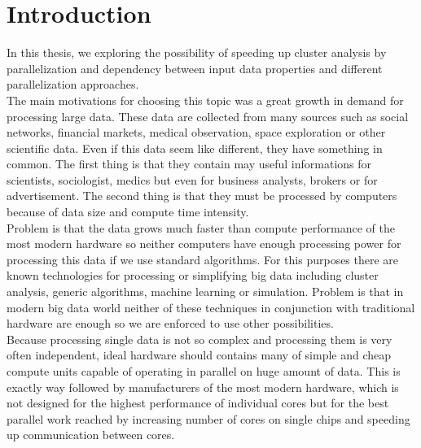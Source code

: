 \pagestyle{plain}
\setcounter{page}{1}

\chapter{Introduction}

In this thesis, we exploring the possibility of speeding  up cluster analysis by parallelization and dependency between input data properties and different parallelization approaches.\\
The main motivations for choosing this topic was a great growth in demand for processing large data. These data are collected from many sources such as social networks, financial markets, medical observation, space exploration or other scientific data. Even if this data seem like different, they have something in common. The first thing is that they contain may useful informations for scientists, sociologist, medics but even for business analysts, brokers or for advertisement. The second thing is that they must be processed by computers because of data size and compute time intensity. \\

Problem is that the data grows much faster than compute performance of the most modern hardware so neither computers have enough processing power for processing this data if we use standard algorithms. For this purposes there are known technologies for processing or simplifying big data including cluster analysis, generic algorithms, machine learning or simulation.
Problem is that in modern big data world neither of these techniques in conjunction with traditional hardware are enough so we are enforced to use other possibilities. \\
Because processing single data is not so complex and processing them is very often independent, ideal hardware should contains many of simple and cheap compute units capable of operating in parallel on huge amount of data. This is exactly way followed by manufacturers of the most modern hardware, which is not designed for the highest performance of individual cores but for the best parallel work reached by increasing number of cores on single chips and speeding up communication between cores. \\

